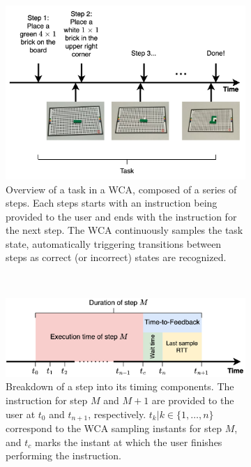 \newpage
\begin{figure}
    \centering
    \begin{subfigure}{\columnwidth}
        \centering
        \includegraphics[width=\columnwidth]{figs/task.png}
        \caption{%
            Overview of a task in a \ac{WCA}, composed of a series of steps.
            Each steps starts with an instruction being provided to the user and ends with the instruction for the next step.
            The \ac{WCA} continuously samples the task state, automatically triggering transitions between steps as correct (or incorrect) states are recognized.
        }\label{fig:task}
    \end{subfigure}\\
    \begin{subfigure}{\columnwidth}
        \centering
        \includegraphics[width=\columnwidth]{figs/step_time.png}
        \caption{%
            Breakdown of a step into its timing components.
            The instruction for step \( M \) and \( M + 1 \) are provided to the user at \( t_0 \) and \( t_{n+1} \), respectively.
            \( t_k | k \in \{1, \ldots, n \} \) correspond to the \ac{WCA} sampling instants for step \( M \), and \( t_c \) marks the instant at which the user finishes performing the instruction.
        }\label{fig:step}
    \end{subfigure}
    \caption{}
\end{figure}


